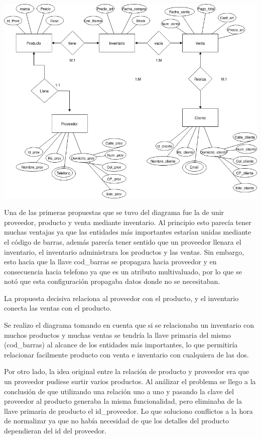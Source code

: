 \documentclass[12pt, letterpaper]{article}     %
\begin{document}
	\vspace{5mm} %
	\includegraphics[scale=0.4]{DiagramaER}

	Una de las primeras propuestas que se tuvo del diagrama fue la de unir proveedor, producto y venta mediante inventario. Al principio esto parecía tener muchas ventajas ya que las entidades más importantes estarían unidas mediante el código de barras, además parecía tener sentido que un proveedor llenara el inventario, el inventario administrara los productos y las ventas. Sin embargo, esto hacia que la llave cod\_barras se propagara hacia proveedor y en consecuencia hacia telefono ya que es un atributo multivaluado, por lo que se notó que esta configuración propagaba datos donde no se necesitaban.
	
	La propuesta decisiva relaciona al proveedor con el producto, y el inventario conecta las ventas con el producto.	
	
	Se realizo el diagrama tomando en cuenta que si se relacionaba un inventario con muchos productos y muchas ventas se tendría la llave primaria del mismo (cod\_barras) al alcance de los entidades más importantes, lo que permitiría relacionar facilmente producto con venta e inventario con cualquiera de las dos.
	
	Por otro lado, la idea original entre la relación de producto y proveedor era que un proveedor pudiese surtir varios productos. Al análizar el problema se llego a la conclusión de que utilizando una relación uno a uno y pasando la clave del proveedor al producto generaba la misma funcionalidad, pero eliminaba de la llave primaria de producto el id\_proveedor. Lo que soluciono conflictos a la hora de normalizar ya que no había necesidad de que los detalles del producto dependieran del id del proveedor.
	\vspace{5mm} 
	
\end{document}
